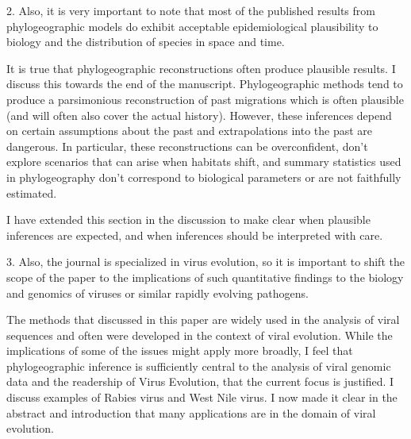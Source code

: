 \documentclass[11pt, oneside]{article}   	%
\newcommand{\response}[1]{{\color{black}{\bf Response:} #1}}
\begin{document}
2. Also, it is very important to note that most of the published results from phylogeographic models do exhibit acceptable epidemiological plausibility to biology and the distribution of species in space and time.

\response{It is true that phylogeographic reconstructions often produce plausible results. I discuss this towards the end of the manuscript. Phylogeographic methods tend to produce a parsimonious reconstruction of past migrations which is often plausible (and will often also cover the actual history). However, these inferences depend on certain assumptions about the past and extrapolations into the past are dangerous. In particular, these reconstructions can be overconfident, don't explore scenarios that can arise when habitats shift, and summary statistics used in phylogeography don't correspond to biological parameters or are not faithfully estimated.

I have extended this section in the discussion to make clear when plausible inferences are expected, and when inferences should be interpreted with care.
}

3. Also, the journal is specialized in virus evolution, so it is important to shift the scope of the paper to the implications of such quantitative findings to the biology and genomics of viruses or similar rapidly evolving pathogens.

\response{The methods that discussed in this paper are widely used in the analysis of viral sequences and often were developed in the context of viral evolution. While the implications of some of the issues might apply more broadly, I feel that phylogeographic inference is sufficiently central to the analysis of viral genomic data and the readership of Virus Evolution, that the current focus is justified.
I discuss examples of Rabies virus and West Nile virus. I now made it clear in the abstract and introduction that many applications are in the domain of viral evolution.}
\end{document}
